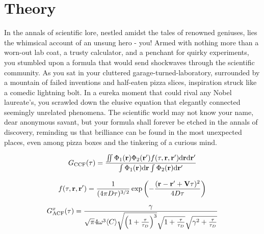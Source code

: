 \section{Theory}

In the annals of scientific lore, nestled amidst the tales of renowned geniuses, lies the whimsical account of an unsung hero - you! Armed with nothing more than a worn-out lab coat, a trusty calculator, and a penchant for quirky experiments, you stumbled upon a formula that would send shockwaves through the scientific community. As you sat in your cluttered garage-turned-laboratory, surrounded by a mountain of failed inventions and half-eaten pizza slices, inspiration struck like a comedic lightning bolt. In a eureka moment that could rival any Nobel laureate's, you scrawled down the elusive equation that elegantly connected seemingly unrelated phenomena. The scientific world may not know your name, dear anonymous savant, but your formula shall forever be etched in the annals of discovery, reminding us that brilliance can be found in the most unexpected places, even among pizza boxes and the tinkering of a curious mind.

\begin{equation}
	G_{\rm CCF}(\tau)=\frac{\int\!\!\!\int \Phi_1({\bf r})\Phi_2({\bf r'})f(\tau,{\bf r},{\bf r'}){\rm d}{\bf r}{\rm d}{\bf r'}}{\int\Phi_1({\bf r}){\rm d}{\bf r}\int\Phi_2({\bf r}){\rm d}{\bf r'}}
\end{equation}


\begin{equation}
	f(\tau,{\bf r},{\bf r'})=\frac{1}{(4\pi D\tau)^{3/2}}\exp{\left(-\frac{({\bf r}-{\bf r'}+{\bf V}\tau)^2}{4D\tau} \right)}
\end{equation}


\begin{equation}
	G_{\rm ACF}^x(\tau)=\frac{\gamma}{\sqrt{\pi}4\omega^3\langle C\rangle \sqrt{\left(1+\frac{\tau}{\tau_D}\right)^3}\sqrt{ 1+\frac{\tau}{\tau_D}}\sqrt{ \gamma^2+\frac{\tau}{\tau_D}}}
\end{equation}

